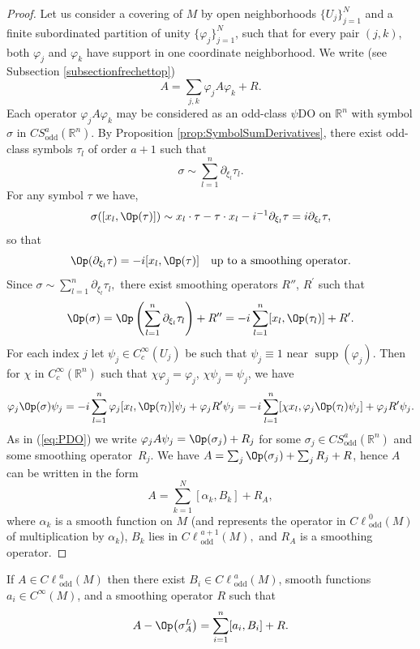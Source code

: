 \documentclass[pdftex]{sigma}
\DeclareMathOperator{\odd}{odd} \DeclareMathOperator{\supp}{supp}
\def \Cl {{C\ell}}
\begin{document}
\begin{proof}
Let us consider a covering of $M$ by open neighborhoods $\{U_j\}_{j=1}^N$ and a f\/inite subordinated partition of unity $\{\varphi_j\}_{j=1}^N$, such that for every pair $(j,k)$, both $\varphi_j$ and $\varphi_k$ have support in one coordinate neighborhood. We write (see Subsection \ref{subsectionfrechettop})
\[
A=\sum_{j,k}\varphi_jA\varphi_k+R.
\]
Each operator $\varphi_jA\varphi_k$ may be considered as an odd-class $\psi$DO on $\mathbb{R}^n$ with symbol $\sigma$ in $CS^a_{\odd}(\mathbb{R}^n).\!$ By Proposition \ref{prop:SymbolSumDerivatives}, there exist odd-class symbols $\tau_l$ of order $a+1$ such that
\[
\sigma\sim\sum\limits_{l=1}^n\partial_{\xi_l}\tau_l.
\]
For any symbol $\tau$ we have,
\[
\sigma([x_l,\Op(\tau)])\sim x_l\cdot \tau-\tau\cdot x_l-i^{-1}\partial_{\xi_l}\tau =i\partial_{\xi_l}\tau,
\]
so that
\[
\Op(\partial_{\xi_l}\tau)=-i[x_l,\Op(\tau)] \quad {\rm up\ to\ a\ smoothing\ operator.}
\]
Since $\sigma\sim\sum\limits_{l=1}^n\partial_{\xi_l}\tau_l,$ there exist smoothing operators $R''$, $R^\prime$ such that
\[
\Op(\sigma)=\Op\left(\sum\limits_{l=1}^n\partial_{\xi_l}\tau_l\right)+R''=-i\sum\limits_{l=1}^n [x_l,\Op(\tau_l)]+R^\prime.
\]
For each index $j$ let $\psi_j\in C_c^\infty(U_j)$ be such that $\psi_j\equiv1$ near $\supp(\varphi_j)$. Then for $\chi$ in $C_c^\infty(\mathbb{R}^n)$ such that $\chi\varphi_j=\varphi_j$, $\chi\psi_j=\psi_j$, we have
\begin{gather*}
\varphi_j\Op(\sigma)\psi_j
 =-i\sum\limits_{l=1}^n\varphi_j[x_l,\Op(\tau_l)]\psi_j+\varphi_jR^\prime\psi_j
 =-i\sum\limits_{l=1}^n [\chi x_l,\varphi_j\Op(\tau_l)\psi_j]+\varphi_jR^\prime\psi_j.
\end{gather*}
As in (\ref{eq:PDO}) we write $\varphi_j A \psi_j= \Op(\sigma_{j}) +R_{j}$ for some $\sigma_j\in CS^{a}_{\odd}(\mathbb{R}^n)$ and some smoothing ope\-ra\-tor~$R_{j}$. We have $A= \sum _{j}\Op(\sigma_{j})+\sum _{j}R_{j}+R$, hence $A$ can be written in the form
\[
A=\sum\limits_{k=1}^{N}[\alpha_k,B_k]+R_A,
\]
where $\alpha_k$ is a smooth function on $M$ (and represents the operator in $\Cl^{0}_{\odd}(M)$ of multiplication by $\alpha_k$), $B_k$ lies in $\Cl^{a+1}_{\odd}(M),$ and $R_A$ is a smoothing operator.
\end{proof}

\begin{corollary}\label{corol2}
If $A\in \Cl^{a}_{\odd}(M)$ then there exist $B_i\in \Cl^{a}_{\odd}(M)$, smooth functions $a_i\in C^\infty(M)$, and a smoothing operator $R$ such that
\[
A-\Op\big(\sigma_A^L\big)=\sum_{i=1}^n[a_i,B_i]+R.
\]
\end{corollary}
\end{document}
